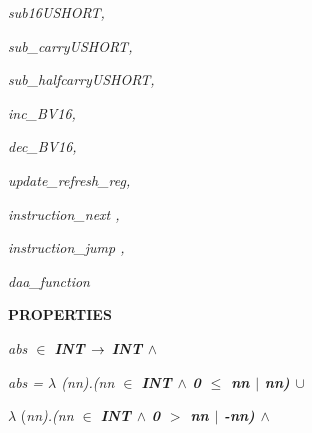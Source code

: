 \documentclass[11pt]{article}
\begin{document}
\begin{sloppypar}
\hspace*{0.20in}\it sub16USHORT\rm ,

\hspace*{0.20in}\it sub\_carryUSHORT\rm ,

\hspace*{0.20in}\it sub\_halfcarryUSHORT\rm ,

\hspace*{0.20in}

\hspace*{0.20in}

\hspace*{0.20in}\it inc\_BV16\rm ,

\hspace*{0.20in}\it dec\_BV16\rm ,

\hspace*{0.20in}

\hspace*{0.20in}\it update\_refresh\_reg\rm ,

\hspace*{0.20in}

\hspace*{0.20in}\it instruction\_next \rm ,

\hspace*{0.20in}\it instruction\_jump \rm ,

\hspace*{0.20in}

\hspace*{0.20in}\it daa\_function

\hspace*{0.20in}

\bf PROPERTIES

\hspace*{0.20in}

\hspace*{0.20in}\it abs  $\in$ \hspace*{0.10in}\bf INT\hspace*{0.10in} $\rightarrow$  \bf INT  $\land$ 

\hspace*{0.20in}\it abs \rm =  $\lambda$  \rm (\it nn\rm )\rm .\rm (\it nn  $\in$  \bf INT\hspace*{0.10in} $\land$  \rm 0  $\leq$  \it nn\hspace*{0.10in} $\mid$  \it nn\hspace*{0.10in}\rm )  $\cup$  

\hspace*{0.20in} $\lambda$  \rm (\it nn\rm )\rm .\rm (\it nn  $\in$  \bf INT\hspace*{0.10in} $\land$  \rm 0 $>$ \it nn $\mid$  \rm -\it nn\hspace*{0.10in}\rm )  $\land$ 


\end{sloppypar}
\end{document}
